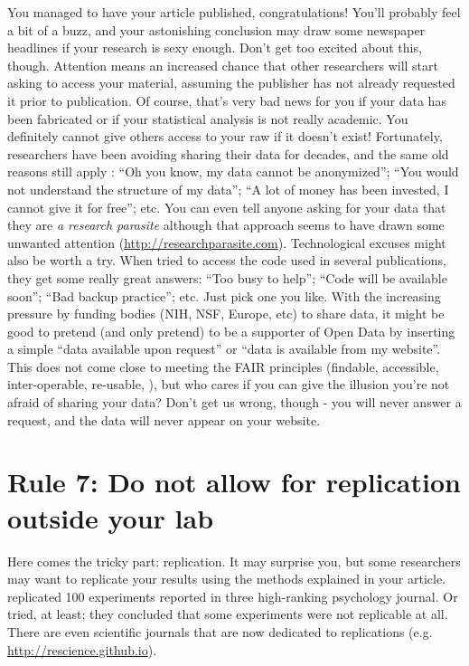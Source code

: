 \documentclass[11pt,letter]{article}
\providecommand\citep{\cite}
\begin{document}
You managed to have your article published, congratulations! You'll probably
feel a bit of a buzz, and your astonishing conclusion may draw some
newspaper headlines if your research is sexy enough. Don't get too excited about this, though. Attention means an increased chance that other researchers will start asking to access your
material, assuming the publisher has not already requested it prior to
publication. Of course, that's very bad news for you if your data
has been fabricated or if your statistical analysis is not really academic. You definitely cannot give others access to your raw if it doesn't exist! Fortunately, researchers have been avoiding sharing their data for decades, and the same old
reasons still apply
\citep{roche:2014}: ``Oh you know, my data cannot be anonymized''; ``You
would not understand the structure of my data''; ``A lot of money has been
invested, I cannot give it for free''; etc. You can even tell anyone
asking for your data that they are {\em a research parasite} \citep{longo:2016}
although that approach seems to have drawn some unwanted attention
(\url{http://researchparasite.com}).  Technological excuses might also be worth
a try. When \citep{collberg:2014,collberg:2015} tried to access the code used in
several publications, they get some really great answers: ``Too busy to help'';
``Code will be available soon''; ``Bad backup practice''; etc. Just pick one
you like. With the increasing pressure by funding bodies (NIH, NSF,
Europe, etc) to share data, it might be good to pretend (and only pretend) to be a
supporter of Open Data by inserting a simple ``data available upon request'' or
``data is available from my website''. This does not come close to meeting the
FAIR principles (findable, accessible, inter-operable, re-usable,
\cite{wilkinson:2016}), but who cares if you can give the illusion you're not
afraid of sharing your data? Don't get us wrong, though - you will never answer a
request, and the data will never appear on your website.


\section*{Rule 7: Do not allow for replication outside your lab}

Here comes the tricky part: replication. It may surprise you, but some researchers
may want to replicate your results using the methods explained in your
article. \citep{nosek:2015} replicated 100 experiments reported in three high-ranking psychology journal. Or tried, at least; they
concluded that some experiments were not replicable at all. There are even scientific journals that are now dedicated to replications
(e.g. \url{http://rescience.github.io}). 
\end{document}
